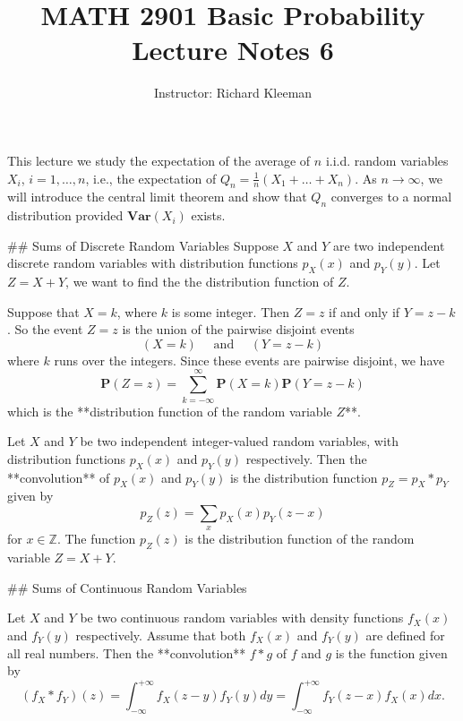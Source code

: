 


\title{MATH 2901 Basic Probability Lecture Notes 6}
\author{Instructor: Richard Kleeman}
\date{}
\maketitle


This lecture we study the expectation of the average of $n$ i.i.d. random variables $X_i$, $i=1,\dots, n$, i.e., the expectation of $Q_n = \frac{1}{n} (X_1 + \dots + X_n)$. As $n \to \infty$, we will introduce the central limit theorem and show that $Q_n$ converges to a normal distribution provided $\mathbf{Var}(X_i)$ exists.


## Sums of Discrete Random Variables
Suppose $X$ and $Y$ are two independent discrete random variables with distribution functions $p_X(x)$ and $p_Y(y)$. Let $Z = X + Y$, we want to find the the distribution function of $Z$. 

Suppose that $X = k$, where $k$ is some integer. Then $Z = z$ if and only if $Y = z-k$. So the event $Z = z$ is the union of the pairwise disjoint events
\begin{equation*}
    (X=k) \quad  \text { and } \quad  (Y=z-k)
\end{equation*}
where $k$ runs over the integers. Since these events are pairwise disjoint, we have
\begin{equation}
    \label{eq:6.1}
    \tag{6-1}
    \mathbf{P}(Z=z)=\sum_{k=-\infty}^{\infty} \mathbf{P}(X=k)  \mathbf{P}(Y=z-k)
\end{equation}
which is the **distribution function of the random variable $Z$**.

\begin{definition}
Let $X$ and $Y$ be two independent integer-valued random variables, with distribution functions $p_X(x)$ and $p_Y(y)$ respectively. Then the **convolution** of $p_X(x)$ and $p_Y(y)$ is the distribution function $p_Z = p_X * p_Y$ given by
\begin{equation*}
    p_Z(z) = \sum_{x} p_X(x) p_Y(z-x)
\end{equation*}
for $x\in \mathbb{Z}$. The function $p_Z(z)$ is the distribution function of the random variable $Z = X + Y$.
\end{definition}


## Sums of Continuous Random Variables
\begin{definition}
Let $X$ and $Y$ be two continuous random variables with density functions $f_X(x)$ and $f_Y(y)$ respectively. Assume that both $f_X(x)$ and $f_Y(y)$ are defined for all real numbers. Then the **convolution** $f * g$ of $f$ and $g$ is the function given by
\begin{equation}
    \label{eq:6.2}
    \tag{6-2}
    (f_X * f_Y)(z) = \int_{-\infty}^{+\infty} f_X(z-y) f_Y(y) d y = \int_{-\infty}^{+\infty} f_Y(z-x) f_X(x) d x.
\end{equation}
\end{definition}


